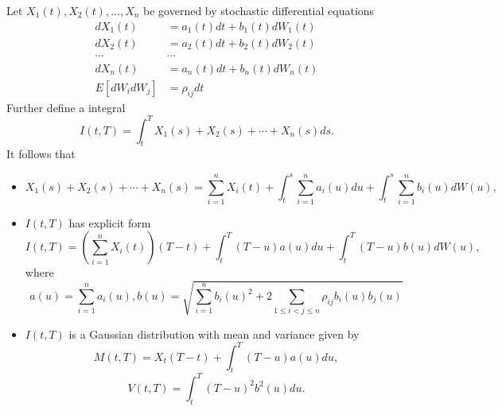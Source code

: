 \begin{refsection}
\begin{lemma}Let $X_1(t),X_2(t),...,X_n$ be governed by stochastic differential equations 
	\begin{align*}
	dX_1(t) &= a_1(t)dt + b_1(t)dW_1(t) \\
	dX_2(t) &= a_2(t)dt + b_2(t)dW_2(t) \\
	\cdots & \cdots \\
	dX_n(t) &= a_n(t)dt + b_n(t)dW_n(t) \\
	E[dW_idW_j] &= \rho_{ij} dt 
	\end{align*}	
	Further define a integral $$I(t,T) = \int_t^T X_1(s) + X_2(s) + \cdots + X_n(s) ds.$$
	It follows that
	\begin{itemize}
		\item $$X_1(s) + X_2(s) + \cdots + X_n(s)=  \sum_{i=1}^n X_i(t) + \int_t^s\sum_{i=1}^n a_i(u)du + \int_t^s \sum_{i=1}^n b_i(u) dW(u),$$
		\item $I(t,T)$ has explicit form
		$$I(t,T) = (\sum_{i=1}^n X_i(t))(T-t) + \int_t^T (T-u)a(u)du + \int_t^T(T-u)b(u)dW(u),$$
		where
		$$a(u)= \sum_{i=1}^n a_i(u), b(u) = \sqrt{\sum_{i=1}^n b_i(u)^2 +  2\sum_{1\leq i <j\leq n}\rho_{ij} b_i(u)b_j(u)}$$
		\item $I(t,T)$ is a Gaussian distribution with mean and variance given by
		$$M(t,T) = X_t(T-t) + \int_t^T (T-u)a(u)du, $$
		$$V(t,T) = \int_t^T (T-u)^2b^2(u)du. $$
	\end{itemize}	
\end{lemma}


\end{refsection}
